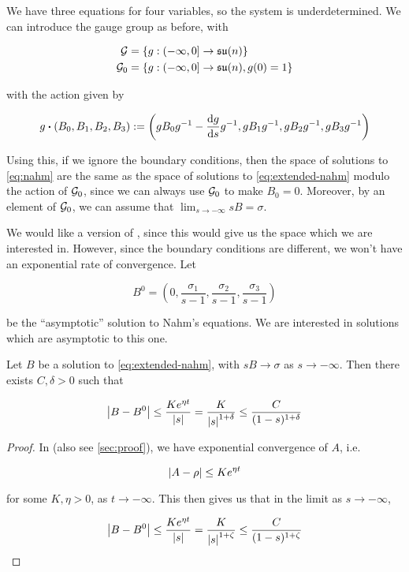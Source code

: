 \documentclass{report}
\newcommand{\su}{\mathfrak{su}}
\renewcommand{\sl}{\mathfrak{sl}}
\begin{document}
We have three equations for four variables, so the system is underdetermined. We can introduce the gauge group as before, with

\begin{align*}
    \mcG &= \left\{g : \Ioc{-\infty, 0} \to \su(n)\right\} \\
    \mcG_0 &= \left\{g : \Ioc{-\infty, 0} \to \su(n), g(0) = 1\right\}
\end{align*}

with the action given by

\[g \vdot (B_0, B_1, B_2, B_3) := \left(gB_0g^{-1} - \dv{g}{s}g^{-1}, gB_1g^{-1}, gB_2g^{-1}, gB_3g^{-1}\right)\]

Using this, if we ignore the boundary conditions, then the space of solutions to \cref{eq:nahm} are the same as the space of solutions to \cref{eq:extended-nahm} modulo the action of \(\mathcal{G}_0\), since we can always use \(\mathcal{G}_0\) to make \(B_0 = 0\). Moreover, by an element of \(\mathcal{G}_0\), we can assume that \(\lim_{s \to -\infty}sB = \sigma\). 

We would like a version of \cite[Lemma 3.4]{kronheimer_hyper-kahlerian_1990}, since this would give us the space which we are interested in. However, since the boundary conditions are different, we won't have an exponential rate of convergence. Let

\[B^0 = \left(0, \frac{\sigma_1}{s-1}, \frac{\sigma_2}{s-1}, \frac{\sigma_3}{s-1}\right)\]

be the ``asymptotic'' solution to Nahm's equations. We are interested in solutions which are asymptotic to this one. 

\begin{lemma}
    \label{lem:rate-of-convergence}
    Let \(B\) be a solution to \cref{eq:extended-nahm}, with \(sB \to \sigma\) as \(s \to -\infty\). Then there exists \(C, \delta > 0\) such that

    \[\abs{B - B^0} \le \frac{Ke^{\eta t}}{\abs{s}} = \frac{K}{\abs{s}^{1+\delta}} \le \frac{C}{(1-s)^{1+\delta}}\]
\end{lemma}

\begin{proof}
    In \cite[Proof of Theorem 1, p. 482]{kronheimer_instantons_1990} (also see \cref{sec:proof}), we have exponential convergence of \(A\), i.e.
    
    \[\abs{A - \rho} \le Ke^{\eta t}\]
    
    for some \(K, \eta > 0\), as \(t \to -\infty\). This then gives us that in the limit as \(s \to -\infty\),
    
    \[\abs{B - B^0} \le \frac{Ke^{\eta t}}{\abs{s}} = \frac{K}{\abs{s}^{1+\zeta}} \le \frac{C}{(1-s)^{1+\zeta}}\]
\end{proof}
\end{document}
